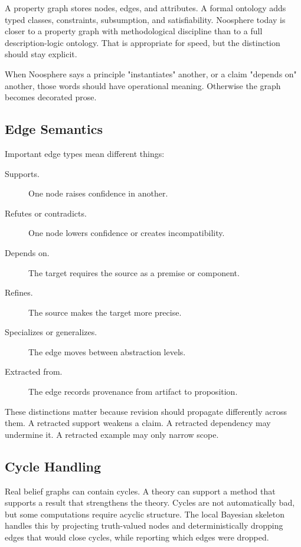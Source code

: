 \documentclass[11pt]{article}
\begin{document}
A property graph stores nodes, edges, and attributes. A formal ontology adds
typed classes, constraints, subsumption, and satisfiability. Noosphere today is
closer to a property graph with methodological discipline than to a full
description-logic ontology. That is appropriate for speed, but the distinction
should stay explicit.

When Noosphere says a principle "instantiates" another, or a claim "depends on"
another, those words should have operational meaning. Otherwise the graph
becomes decorated prose.

\subsection{Edge Semantics}

Important edge types mean different things:

\begin{description}
\item[Supports.] One node raises confidence in another.
\item[Refutes or contradicts.] One node lowers confidence or creates
incompatibility.
\item[Depends on.] The target requires the source as a premise or component.
\item[Refines.] The source makes the target more precise.
\item[Specializes or generalizes.] The edge moves between abstraction levels.
\item[Extracted from.] The edge records provenance from artifact to proposition.
\end{description}

These distinctions matter because revision should propagate differently across
them. A retracted support weakens a claim. A retracted dependency may undermine
it. A retracted example may only narrow scope.

\subsection{Cycle Handling}

Real belief graphs can contain cycles. A theory can support a method that
supports a result that strengthens the theory. Cycles are not automatically
bad, but some computations require acyclic structure. The local Bayesian
skeleton handles this by projecting truth-valued nodes and deterministically
dropping edges that would close cycles, while reporting which edges were
dropped.
\end{document}

